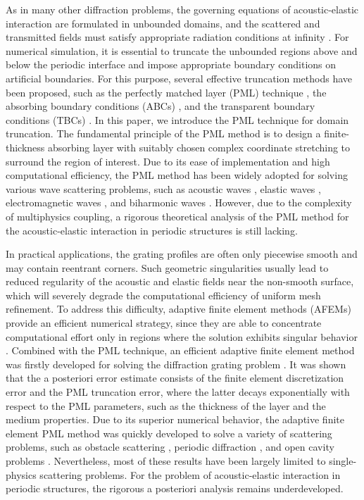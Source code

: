 \documentclass[final,3p,times]{elsarticle}
\begin{document}
As in many other diffraction problems, the governing equations of acoustic-elastic interaction are formulated in unbounded domains, and the scattered and transmitted fields must satisfy appropriate radiation conditions at infinity \cite{Bao22}. For numerical simulation, it is essential to truncate the unbounded regions above and below the periodic interface and impose appropriate boundary conditions on artificial boundaries. For this purpose, several effective truncation methods have been proposed, such as the perfectly matched layer (PML) technique \cite{Berenger94}, the absorbing boundary conditions (ABCs) \cite{Engquist77}, and the transparent boundary conditions (TBCs) \cite{Grote04, Jiang17}. In this paper, we introduce the PML technique for domain truncation. The fundamental principle of the PML method is to design a finite-thickness absorbing layer with suitably chosen complex coordinate stretching to surround the region of interest. Due to its ease of implementation and high computational efficiency, the PML method has been widely adopted for solving various wave scattering problems, such as acoustic waves \cite{LiY25, Lu23, Lu25}, elastic waves \cite{Bramble10, Chen16, Jiang18}, electromagnetic waves \cite{Bao24,Bao05}, and biharmonic waves \cite{LiIMA25}. However, due to the complexity of multiphysics coupling, a rigorous theoretical analysis of the PML method for the acoustic-elastic interaction in periodic structures is still lacking. 

In practical applications, the grating profiles are often only piecewise smooth and may contain reentrant corners. Such geometric singularities usually lead to reduced regularity of the acoustic and elastic fields near the non-smooth surface, which will severely degrade the computational efficiency of uniform mesh refinement. To address this difficulty, adaptive finite element methods (AFEMs)  provide an efficient numerical strategy, since they are able to concentrate computational effort only in regions where the solution exhibits singular behavior \cite{Babuska78}. Combined with the PML technique, an efficient adaptive finite element method was firstly developed for solving the diffraction grating problem \cite{Chen03}. It was shown that the a posteriori error estimate consists of the finite element discretization error and the PML truncation error, where the latter decays exponentially with respect to the PML parameters, such as the thickness of the layer and the medium properties. Due to its superior numerical behavior, the adaptive finite element PML method was quickly developed to solve a variety of scattering problems, such as obstacle scattering \cite{ Chen08, Chen05, JiangLi17}, periodic diffraction \cite{Bao10, Jiang17-3, Zhou18}, and open cavity problems \cite{ChenY21}. Nevertheless, most of these results have been largely limited to single-physics scattering problems. For the problem of acoustic-elastic interaction in periodic structures, the rigorous a posteriori analysis remains underdeveloped.
\end{document}
